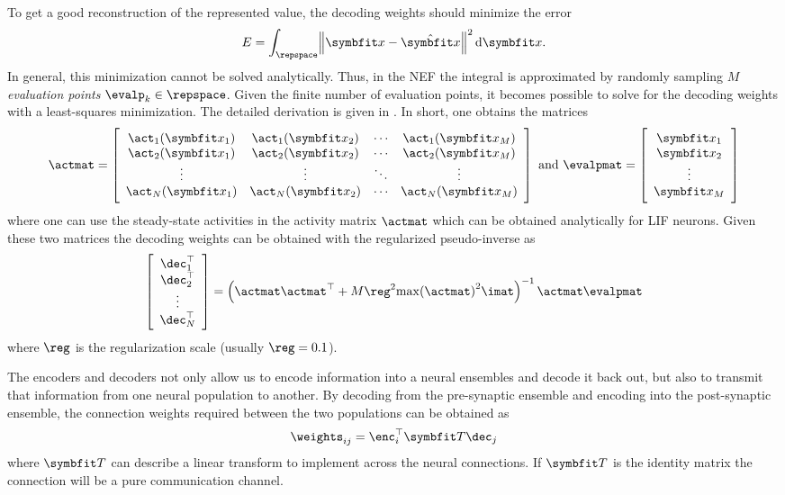 To get a good reconstruction of the represented value, the decoding weights should minimize the error
\begin{equation}
    E = \int_{\repspace} \norm{\vc x - \hat{\vc x}}^2 \dif \vc x \text{.}
\end{equation}
In general, this minimization cannot be solved analytically.
Thus, in the NEF the integral is approximated by randomly sampling $M$ \emph{evaluation points} $\evalp_k \in \repspace$.
Given the finite number of evaluation points, it becomes possible to solve for the decoding weights with a least-squares minimization.
The detailed derivation is given in \textcite[Ch.~2]{eliasmith2003}.
In short, one obtains the matrices
\begin{equation}
    \actmat = \sbr{\begin{array}{cccc}
            \act_1(\vc x_1) & \act_1(\vc x_2) & \cdots & \act_1(\vc x_M) \\
            \act_2(\vc x_1) & \act_2(\vc x_2) & \cdots & \act_2(\vc x_M) \\
            \vdots & \vdots & \ddots & \vdots \\
            \act_N(\vc x_1) & \act_N(\vc x_2) & \cdots & \act_N(\vc x_M) \\
    \end{array}}
    \ \text{and}\ 
    \evalpmat = \sbr{\begin{array}{c}
            \vc x_1 \\ \vc x_2 \\ \vdots \\ \vc x_M
    \end{array}}
\end{equation}
where one can use the steady-state activities in the activity matrix $\actmat$ which can be obtained analytically for LIF neurons.
Given these two matrices the decoding weights can be obtained with the regularized pseudo-inverse as
\begin{equation}
    \sbr{\begin{array}{c}
            \dec_1\Tr \\ \dec_2\Tr \\ \vdots \\ \dec_N\Tr
        \end{array}} = \del{\actmat \actmat\Tr + M \reg^2 {\max(\actmat)}^2 \imat}^{-1} \actmat \evalpmat
\end{equation}
where $\reg$ is the regularization scale (usually $\reg = 0.1$).

The encoders and decoders not only allow us to encode information into a neural ensembles and decode it back out, but also to transmit that information from one neural population to another.
By decoding from the pre-synaptic ensemble and encoding into the post-synaptic ensemble, the connection weights required between the two populations can be obtained as
\begin{equation}
    \weights_{ij} = \enc_i\Tr \mat T \dec_j
\end{equation}
where $\mat T$ can describe a linear transform to implement across the neural connections.
If $\mat T$ is the identity matrix the connection will be a pure communication channel.


